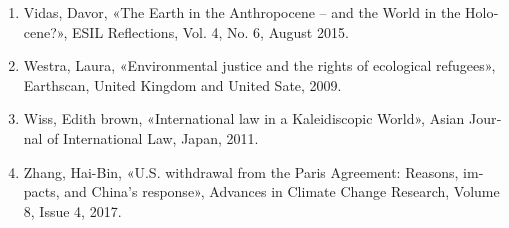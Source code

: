 {\begin{latin}
{\begin{enumerate}
	\item Vidas, Davor, «The Earth in the Anthropocene – and the World in the Holocene?», ESIL Reflections, Vol. 4, No. 6, August 2015.
		
		\item Westra, Laura, «Environmental justice and the rights of ecological refugees», Earthscan, United Kingdom and United Sate, 2009.
		
		
		\item Wiss, Edith brown, «International law in a Kaleidiscopic World», Asian Journal of International Law, Japan, 2011.
		 
		 \item Zhang, Hai-Bin, «U.S. withdrawal from the Paris Agreement: Reasons, impacts, and China's response», Advances in Climate Change Research, Volume 8, Issue 4, 2017.
			
			
		\end{enumerate}
	}
		
		
		
	
\end{latin}
}
